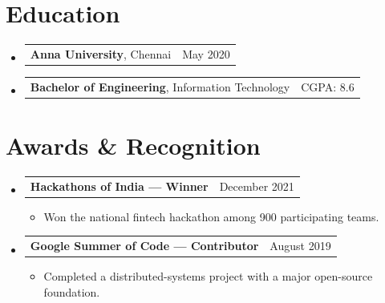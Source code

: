 \documentclass[letterpaper,11pt]{article}
\makeatletter
\newcommand{\resumeItem}[1]{%
  \item\small{#1 \vspace{-1pt}}%
}
\newcommand{\resumeSubheading}[3]{%
  \vspace{2pt}\item
    \begin{tabular*}{\linewidth}[t]{l@{\extracolsep{\fill}}r}
      \textbf{#1}, #2 & #3 \\
    \end{tabular*}\vspace{-4pt}%
}
\newcommand{\resumeProjectHeading}[2]{%
    \vspace{2pt}\item
    \begin{tabular*}{\linewidth}{l@{\extracolsep{\fill}}r}
      \small#1 & #2 \\
    \end{tabular*}\vspace{-4pt}%
}
\newcommand{\resumeSubHeadingListStart}{\begin{itemize}[leftmargin=0.15in, label={}, parsep=0pt, topsep=0pt, itemsep=4pt]}
\newcommand{\resumeSubHeadingListEnd}{\end{itemize}}
\newcommand{\resumeItemListStart}{\begin{itemize}[leftmargin=0.15in, parsep=0pt, topsep=2pt, itemsep=3pt, label=$\bullet$]}
\newcommand{\resumeItemListEnd}{\end{itemize}\vspace{-2pt}}
\makeatother
\begin{document}
\section{Education}
\resumeSubHeadingListStart
\resumeSubheading{Anna University}{Chennai}{May 2020}
\vspace{-15pt}
\resumeSubheading{Bachelor of Engineering}{Information Technology}{CGPA: 8.6}
\resumeSubHeadingListEnd

\section{Awards \& Recognition}
\resumeSubHeadingListStart
\resumeProjectHeading{\textbf{Hackathons of India --- Winner}}{December 2021}
\resumeItemListStart
\resumeItem{Won the national fintech hackathon among 900 participating teams.}
\resumeItemListEnd
\resumeProjectHeading{\textbf{Google Summer of Code --- Contributor}}{August 2019}
\resumeItemListStart
\resumeItem{Completed a distributed-systems project with a major open-source foundation.}
\resumeItemListEnd
\resumeSubHeadingListEnd
\end{document}
